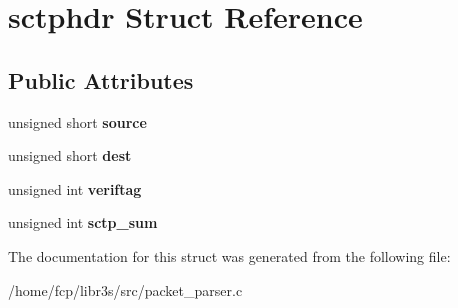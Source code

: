 \hypertarget{structsctphdr}{}\section{sctphdr Struct Reference}
\label{structsctphdr}
\subsection*{Public Attributes}
\begin{DoxyCompactItemize}
\item 
\mbox{\label{structsctphdr_ac0729862b907f958a545c22412569dd8}} 
unsigned short {\bfseries source}
\item 
\mbox{\label{structsctphdr_a23d0c34dfb51a6493d29a3093792435d}} 
unsigned short {\bfseries dest}
\item 
\mbox{\label{structsctphdr_ae7e9009b5447b2a6599a1c5f759cc184}} 
unsigned int {\bfseries veriftag}
\item 
\mbox{\label{structsctphdr_a2f8c34ca712a7a473f0baab5ddc8fbfe}} 
unsigned int {\bfseries sctp\+\_\+sum}
\end{DoxyCompactItemize}


The documentation for this struct was generated from the following file\+:\begin{DoxyCompactItemize}
\item 
/home/fcp/libr3s/src/packet\+\_\+parser.\+c\end{DoxyCompactItemize}
